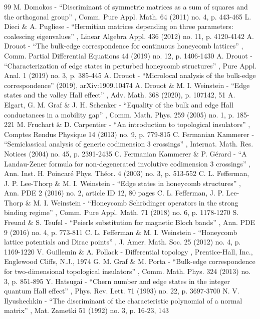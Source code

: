 \documentclass[11pt]{article}
\numberwithin{equation}{section}
\begin{document}
\begin{thebibliography}{99}
 M. Domokos - “Discriminant of symmetric matrices as a sum of squares and the orthogonal group” , Comm. Pure Appl. Math. 64 (2011) no. 4, p. 443-465
 L. Dieci \& A. Pugliese - “Hermitian matrices depending on three parameters: coalescing eigenvalues” , Linear Algebra Appl. 436 (2012) no. 11, p. 4120-4142
 A. Drouot - “The bulk-edge correspondence for continuous honeycomb lattices” , Comm. Partial Differential Equations 44 (2019) no. 12, p. 1406-1430
 A. Drouot - “Characterization of edge states in perturbed honeycomb structures” , Pure Appl. Anal. 1 (2019) no. 3, p. 385-445
 A. Drouot - “Microlocal analysis of the bulk-edge correspondence” (2019), arXiv:1909.10474
 A. Drouot \& M. I. Weinstein - “Edge states and the valley Hall effect” , Adv. Math. 368 (2020), p. 107142, 51
 A. Elgart, G. M. Graf \& J. H. Schenker - “Equality of the bulk and edge Hall conductances in a mobility gap” , Comm. Math. Phys. 259 (2005) no. 1, p. 185-221
 M. Fruchart \& D. Carpentier - “An introduction to topological insulators” , Comptes Rendus Physique 14 (2013) no. 9, p. 779-815
 C. Fermanian Kammerer - “Semiclassical analysis of generic codimension 3 crossings” , Internat. Math. Res. Notices (2004) no. 45, p. 2391-2435
 C. Fermanian Kammerer \& P. Gérard - “A Landau-Zener formula for non-degenerated involutive codimension 3 crossings” , Ann. Inst. H. Poincaré Phys. Théor. 4 (2003) no. 3, p. 513-552
 C. L. Fefferman, J. P. Lee-Thorp \& M. I. Weinstein - “Edge states in honeycomb structures” , Ann. PDE 2 (2016) no. 2, article ID 12, 80 pages
 C. L. Fefferman, J. P. Lee-Thorp \& M. I. Weinstein - “Honeycomb Schrödinger operators in the strong binding regime” , Comm. Pure Appl. Math. 71 (2018) no. 6, p. 1178-1270
 S. Freund \& S. Teufel - “Peierls substitution for magnetic Bloch bands” , Ann. PDE 9 (2016) no. 4, p. 773-811
 C. L. Fefferman \& M. I. Weinstein - “Honeycomb lattice potentials and Dirac points” , J. Amer. Math. Soc. 25 (2012) no. 4, p. 1169-1220
 V. Guillemin \& A. Pollack - Differential topology , Prentice-Hall, Inc., Englewood Cliffs, N.J., 1974
 G. M. Graf \& M. Porta - “Bulk-edge correspondence for two-dimensional topological insulators” , Comm. Math. Phys. 324 (2013) no. 3, p. 851-895
 Y. Hatsugai - “Chern number and edge states in the integer quantum Hall effect” , Phys. Rev. Lett. 71 (1993) no. 22, p. 3697-3700
 N. V. Ilyushechkin - “The discriminant of the characteristic polynomial of a normal matrix” , Mat. Zametki 51 (1992) no. 3, p. 16-23, 143

\end{thebibliography}
\end{document}
